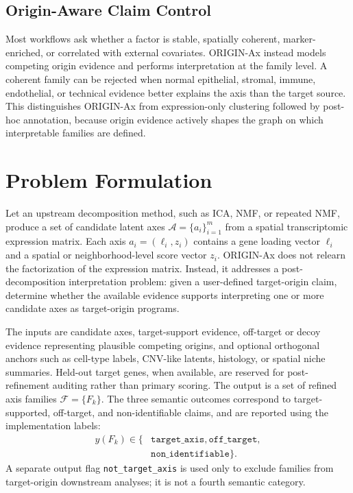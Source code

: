 \documentclass[conference]{IEEEtran}
\begin{document}
\subsection{Origin-Aware Claim Control}

Most workflows ask whether a factor is stable, spatially coherent,
marker-enriched, or correlated with external covariates. ORIGIN-Ax instead
models competing origin evidence and performs interpretation at the family
level. A coherent family can be rejected when normal epithelial, stromal,
immune, endothelial, or technical evidence better explains the axis than the
target source. This distinguishes ORIGIN-Ax from expression-only clustering
followed by post-hoc annotation, because origin evidence actively shapes the
graph on which interpretable families are defined.

\section{Problem Formulation}

Let an upstream decomposition method, such as ICA, NMF, or
repeated NMF, produce a set of candidate latent axes
$\mathcal{A}=\{a_i\}_{i=1}^{m}$ from a spatial transcriptomic
expression matrix. Each axis $a_i=(\ell_i,z_i)$ contains a gene
loading vector $\ell_i$ and a spatial or neighborhood-level score
vector $z_i$. ORIGIN-Ax does not relearn the factorization of the
expression matrix. Instead, it addresses a post-decomposition
interpretation problem: given a user-defined target-origin claim,
determine whether the available evidence supports interpreting
one or more candidate axes as target-origin programs.

The inputs are candidate axes, target-support evidence, off-target or decoy
evidence representing plausible competing origins, and optional orthogonal
anchors such as cell-type labels, CNV-like latents, histology, or spatial niche
summaries. Held-out target genes, when available, are reserved for
post-refinement auditing rather than primary scoring. The output is a set of
refined axis families $\mathcal{F}=\{F_k\}$. The three semantic outcomes
correspond to target-supported, off-target, and non-identifiable claims, and are
reported using the implementation labels:
\[
\begin{aligned}
y(F_k)\in\{&
\texttt{target\_axis},\texttt{off\_target},\\
&\texttt{non\_identifiable}\}.
\end{aligned}
\]
A separate output flag \texttt{not\_target\_axis} is used only to exclude
families from target-origin downstream analyses; it is not a fourth semantic
category.
\end{document}
